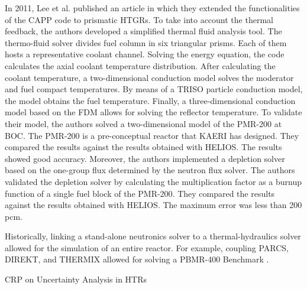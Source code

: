 \documentclass[11pt,letterpaper]{article}
\begin{document}
In 2011, Lee et al. published an article \cite{lee_development_2011} in which they extended the functionalities of the CAPP code to prismatic \glspl{HTGR}.
To take into account the thermal feedback, the authors developed a simplified thermal fluid analysis tool.
The thermo-fluid solver divides fuel column in six triangular prisms.
Each of them hosts a representative coolant channel.
Solving the energy equation, the code calculates the axial coolant temperature distribution.
After calculating the coolant temperature, a two-dimensional conduction model solves the moderator and fuel compact temperatures.
By means of a TRISO particle conduction model, the model obtains the fuel temperature.
Finally, a three-dimensional conduction model based on the \gls{FDM} allows for solving the reflector temperature.
To validate their model, the authors solved a two-dimensional model of the PMR-200 at \gls{BOC}.
The PMR-200 is a pre-conceptual reactor that \gls{KAERI} has designed.
They compared the results against the results obtained with HELIOS.
The results showed good accuracy.
Moreover, the authors implemented a depletion solver based on the one-group flux determined by the neutron flux solver.
The authors validated the depletion solver by calculating the multiplication factor as a burnup function of a single fuel block of the PMR-200.
They compared the results against the results obtained with HELIOS.
The maximum error was less than 200 pcm.












Historically, linking a stand-alone neutronics solver to a thermal-hydraulics solver allowed for the simulation of an entire reactor.
For example, coupling PARCS, DIREKT, and THERMIX \cite{seker_analysis_2006} allowed for solving a \gls{PBMR}-400 Benchmark \cite{reitsma_oecdneansc_2006}.

CRP on Uncertainty Analysis in HTRs %
\cite{gougar_htgr_2016}

\pagebreak


\end{document}
